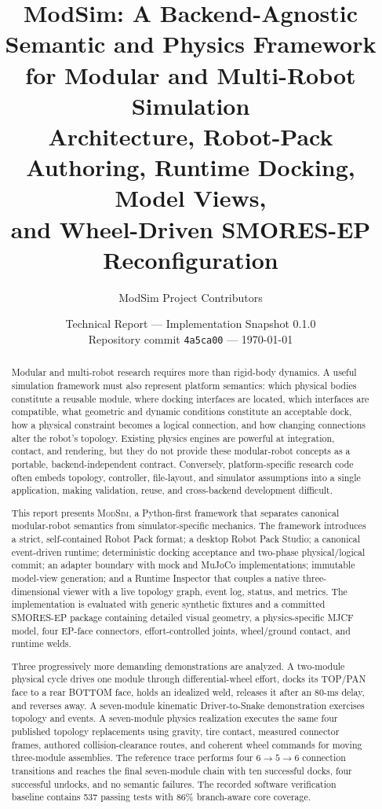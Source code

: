 \documentclass[11pt,oneside]{article}
\title{\textbf{ModSim: A Backend-Agnostic Semantic and Physics Framework\\
for Modular and Multi-Robot Simulation}\\[0.7em]
\large Architecture, Robot-Pack Authoring, Runtime Docking, Model Views,\\
and Wheel-Driven SMORES-EP Reconfiguration}
\author{ModSim Project Contributors}
\date{Technical Report --- Implementation Snapshot 0.1.0\\
Repository commit \texttt{4a5ca00} --- \today}
\newcommand{\modsim}{\textsc{ModSim}}
\newcommand{\robotpack}{Robot Pack}
\newcommand{\mujoco}{MuJoCo}
\newcommand{\smoresep}{SMORES-EP}
\begin{document}
\maketitle

\begin{abstract}
Modular and multi-robot research requires more than rigid-body dynamics. A useful
simulation framework must also represent platform semantics: which physical bodies
constitute a reusable module, where docking interfaces are located, which interfaces
are compatible, what geometric and dynamic conditions constitute an acceptable dock,
how a physical constraint becomes a logical connection, and how changing connections
alter the robot's topology. Existing physics engines are powerful at integration,
contact, and rendering, but they do not provide these modular-robot concepts as a
portable, backend-independent contract. Conversely, platform-specific research code
often embeds topology, controller, file-layout, and simulator assumptions into a
single application, making validation, reuse, and cross-backend development difficult.

This report presents \modsim, a Python-first framework that separates canonical
modular-robot semantics from simulator-specific mechanics. The framework introduces a
strict, self-contained \robotpack{} format; a desktop Robot Pack Studio; a canonical
event-driven runtime; deterministic docking acceptance and two-phase physical/logical
commit; an adapter boundary with mock and \mujoco{} implementations; immutable
model-view generation; and a Runtime Inspector that couples a native three-dimensional
viewer with a live topology graph, event log, status, and metrics. The implementation
is evaluated with generic synthetic fixtures and a committed \smoresep{} package
containing detailed visual geometry, a physics-specific MJCF model, four EP-face
connectors, effort-controlled joints, wheel/ground contact, and runtime welds.

Three progressively more demanding demonstrations are analyzed. A two-module physical
cycle drives one module through differential-wheel effort, docks its TOP/PAN face to a
rear BOTTOM face, holds an idealized weld, releases it after an 80-ms delay, and reverses
away. A seven-module kinematic Driver-to-Snake demonstration exercises topology and
events. A seven-module physics realization executes the same four published topology
replacements using gravity, tire contact, measured connector frames, authored
collision-clearance routes, and coherent wheel commands for moving three-module
assemblies. The reference trace performs four $6\rightarrow5\rightarrow6$ connection
transitions and reaches the final seven-module chain with ten successful docks, four
successful undocks, and no semantic failures. The recorded software verification
baseline contains 537 passing tests with 86\% branch-aware core coverage.


\end{abstract}
\end{document}
